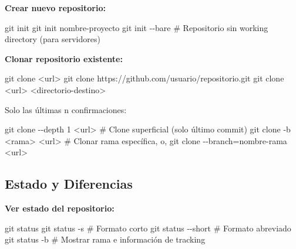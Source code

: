 \documentclass[
  doc,
  floatsintext,
  longtable,
  a4paper,
  nolmodern,
  notxfonts,
  notimes,
  12pt,
  colorlinks=true,linkcolor=blue,citecolor=blue,urlcolor=blue]{apa7}
\newenvironment{Shaded}{\begin{snugshade}}{\end{snugshade}}
\newcommand{\AttributeTok}[1]{\textcolor[rgb]{0.40,0.45,0.13}{#1}}
\newcommand{\CommentTok}[1]{\textcolor[rgb]{0.37,0.37,0.37}{#1}}
\newcommand{\FunctionTok}[1]{\textcolor[rgb]{0.28,0.35,0.67}{#1}}
\newcommand{\NormalTok}[1]{\textcolor[rgb]{0.00,0.23,0.31}{#1}}
\newcommand{\OperatorTok}[1]{\textcolor[rgb]{0.37,0.37,0.37}{#1}}
\begin{document}
\textbf{Crear nuevo repositorio:}

\begin{Shaded}
\begin{Highlighting}[]
\FunctionTok{git}\NormalTok{ init}
\FunctionTok{git}\NormalTok{ init nombre{-}proyecto}
\FunctionTok{git}\NormalTok{ init }\AttributeTok{{-}{-}bare}  \CommentTok{\# Repositorio sin working directory (para servidores)}
\end{Highlighting}
\end{Shaded}

\textbf{Clonar repositorio existente:}

\begin{Shaded}
\begin{Highlighting}[]
\FunctionTok{git}\NormalTok{ clone }\OperatorTok{\textless{}}\NormalTok{url}\OperatorTok{\textgreater{}}
\FunctionTok{git}\NormalTok{ clone https://github.com/usuario/repositorio.git}
\FunctionTok{git}\NormalTok{ clone }\OperatorTok{\textless{}}\NormalTok{url}\OperatorTok{\textgreater{}} \OperatorTok{\textless{}}\NormalTok{directorio{-}destino}\OperatorTok{\textgreater{}}
\end{Highlighting}
\end{Shaded}

Solo las últimas n confirmaciones:

\begin{Shaded}
\begin{Highlighting}[]
\FunctionTok{git}\NormalTok{ clone }\AttributeTok{{-}{-}depth}\NormalTok{ 1 }\OperatorTok{\textless{}}\NormalTok{url}\OperatorTok{\textgreater{}}  \CommentTok{\# Clone superficial (solo último commit)}
\FunctionTok{git}\NormalTok{ clone }\AttributeTok{{-}b} \OperatorTok{\textless{}}\NormalTok{rama}\OperatorTok{\textgreater{}} \OperatorTok{\textless{}}\NormalTok{url}\OperatorTok{\textgreater{}}  \CommentTok{\# Clonar rama específica, o,}
\FunctionTok{git}\NormalTok{ clone }\AttributeTok{{-}{-}branch}\OperatorTok{=}\NormalTok{nombre{-}rama }\OperatorTok{\textless{}}\NormalTok{url}\OperatorTok{\textgreater{}} 
\end{Highlighting}
\end{Shaded}

\subsection{Estado y Diferencias}\label{estado-y-diferencias}

\textbf{Ver estado del repositorio:}

\begin{Shaded}
\begin{Highlighting}[]
\FunctionTok{git}\NormalTok{ status}
\FunctionTok{git}\NormalTok{ status }\AttributeTok{{-}s}              \CommentTok{\# Formato corto}
\FunctionTok{git}\NormalTok{ status }\AttributeTok{{-}{-}short}         \CommentTok{\# Formato abreviado}
\FunctionTok{git}\NormalTok{ status }\AttributeTok{{-}b}              \CommentTok{\# Mostrar rama e información de tracking}
\end{Highlighting}
\end{Shaded}
\end{document}
